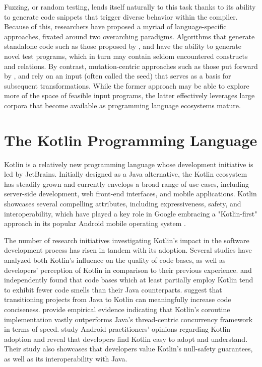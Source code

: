 Fuzzing, or random testing, lends itself naturally to this task thanks to its
ability to generate code snippets that trigger diverse behavior within the compiler.
Because of this, researchers have proposed a myriad of language-specific approaches, 
fixated around two overarching paradigms.
Algorithms that generate standalone code such as those proposed by  
\citet{yang2011finding, holler2012fuzzing, veggalam2016ifuzzer}, and \citet{havrikov2019systematically}
have the ability to generate novel test programs, which in turn may contain
seldom encountered constructs and relations.
By contrast, mutation-centric approaches such as those put forward by 
\citet{le2014compiler, le2015finding, sun2016finding}, and \citet{stepanov2021type}
rely on an input (often called the seed) that serves as a basis for subsequent transformations.
While the former approach may be able to explore more of the
space of feasible input programs, the latter effectively leverages
large corpora that become available as programming language
ecosystems mature.

\section{The Kotlin Programming Language}

Kotlin \cite{kotlinlang} is a relatively new programming language whose development
initiative is led by JetBrains.
Initially designed as a Java alternative, the Kotlin
ecosystem has steadily grown and currently envelops
a broad range of use-cases, including server-side development,
web front-end interfaces, and mobile applications. 
Kotlin showcases several compelling attributes, including expressiveness,
safety, and interoperability, which have played a key role in Google embracing
a "Kotlin-first" approach in its popular Android mobile operating system \cite{kotlinfirst}.

The number of research initiatives investigating Kotlin's impact 
in the software development process has risen in tandem with its adoption.
Several studies have analyzed both Kotlin's influence
on the quality of code bases, as well as developers' perception
of Kotlin in comparison to their previous experience.
\citet{flauzino2018you}  and \citet{gois2019empirical} independently
found that code bases which at least partially employ Kotlin tend to
exhibit fewer code smells than their Java counterparts. 
\citet{ardito2020effectiveness} suggest that transitioning projects
from Java to Kotlin can meaningfully increase code conciseness.
\citet{chauhan2021performance} provide empirical evidence indicating
that Kotlin's coroutine implementation vastly outperforms
Java's thread-centric concurrency framework in terms of speed.
\citet{oliveira2020adoption} study Android practitioners' opinions regarding
Kotlin adoption and reveal that developers find Kotlin easy
to adopt and understand. 
Their study also showcases that developers value Kotlin's
null-safety guarantees, as well as its interoperability with Java.

